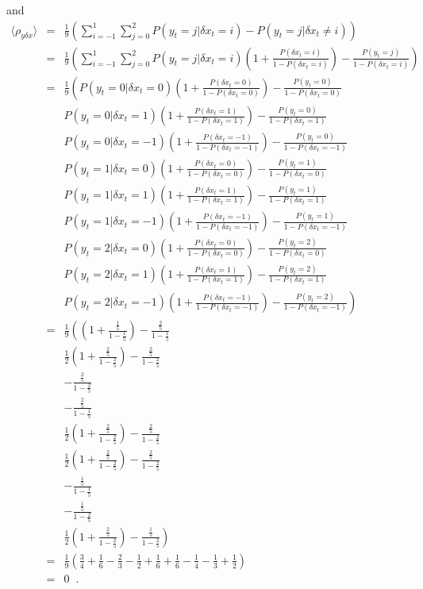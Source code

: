 \documentclass[a4paper,11pt]{article}
\begin{document}
and
\begin{eqnarray}
\langle \rho_{y\delta x}\rangle &=& \frac{1}{9}\left(\sum_{i=-1}^1 \sum_{j=0}^2 P(y_t = j | \delta x_t = i) - P(y_t = j | \delta x_t \neq i)\right)\\
&=& \frac{1}{9}\left(\sum_{i=-1}^1 \sum_{j=0}^2 P(y_t = j | \delta x_t = i)\left(1+\frac{P(\delta x_t = i)}{1-P(\delta x_t = i)}\right)-\frac{P(y_t = j)}{1-P(\delta x_t = i)}\right)\\
&=& \frac{1}{9}\left(P(y_t = 0 | \delta x_t = 0)\left(1+\frac{P(\delta x_t = 0)}{1-P(\delta x_t = 0)}\right)-\frac{P(y_t = 0)}{1-P(\delta x_t = 0)}\right.\\
& & P(y_t = 0 | \delta x_t = 1)\left(1+\frac{P(\delta x_t = 1)}{1-P(\delta x_t = 1)}\right)-\frac{P(y_t = 0)}{1-P(\delta x_t = 1)}\\
& & P(y_t = 0 | \delta x_t = -1)\left(1+\frac{P(\delta x_t = -1)}{1-P(\delta x_t = -1)}\right)-\frac{P(y_t = 0)}{1-P(\delta x_t = -1)}\\
& & P(y_t = 1 | \delta x_t = 0)\left(1+\frac{P(\delta x_t = 0)}{1-P(\delta x_t = 0)}\right)-\frac{P(y_t = 1)}{1-P(\delta x_t = 0)}\\
& & P(y_t = 1 | \delta x_t = 1)\left(1+\frac{P(\delta x_t = 1)}{1-P(\delta x_t = 1)}\right)-\frac{P(y_t = 1)}{1-P(\delta x_t = 1)}\\
& & P(y_t = 1 | \delta x_t = -1)\left(1+\frac{P(\delta x_t = -1)}{1-P(\delta x_t = -1)}\right)-\frac{P(y_t = 1)}{1-P(\delta x_t = -1)}\\
& & P(y_t = 2 | \delta x_t = 0)\left(1+\frac{P(\delta x_t = 0)}{1-P(\delta x_t = 0)}\right)-\frac{P(y_t = 2)}{1-P(\delta x_t = 0)}\\
& & P(y_t = 2 | \delta x_t = 1)\left(1+\frac{P(\delta x_t = 1)}{1-P(\delta x_t = 1)}\right)-\frac{P(y_t = 2)}{1-P(\delta x_t = 1)}\\
& & \left.P(y_t = 2 | \delta x_t = -1)\left(1+\frac{P(\delta x_t = -1)}{1-P(\delta x_t = -1)}\right)-\frac{P(y_t = 2)}{1-P(\delta x_t = -1)}\right)\\
&=& \frac{1}{9}\left(\left(1+\frac{\frac{1}{5}}{1-\frac{1}{5}}\right)-\frac{\frac{2}{5}}{1-\frac{1}{5}}\right.\\
& & \frac{1}{2}\left(1+\frac{\frac{2}{5}}{1-\frac{2}{5}}\right)-\frac{\frac{2}{5}}{1-\frac{2}{5}}\\
& & -\frac{\frac{2}{5}}{1-\frac{2}{5}}\\
& & -\frac{\frac{2}{5}}{1-\frac{1}{5}}\\
& & \frac{1}{2}\left(1+\frac{\frac{2}{5}}{1-\frac{2}{5}}\right)-\frac{\frac{2}{5}}{1-\frac{2}{5}}\\
& & \frac{1}{2}\left(1+\frac{\frac{2}{5}}{1-\frac{2}{5}}\right)-\frac{\frac{2}{5}}{1-\frac{2}{5}}\\
& & -\frac{\frac{1}{5}}{1-\frac{1}{5}}\\
& & -\frac{\frac{1}{5}}{1-\frac{2}{5}}\\
& & \left.\frac{1}{2}\left(1+\frac{\frac{2}{5}}{1-\frac{2}{5}}\right)-\frac{\frac{1}{5}}{1-\frac{2}{5}}\right)\\
&=& \frac{1}{9}\left(\frac{3}{4}+\frac{1}{6}-\frac{2}{3}-\frac{1}{2}+\frac{1}{6}+\frac{1}{6}-\frac{1}{4}-\frac{1}{3}+\frac{1}{2}\right)\\
&=& 0\;\;.
\end{eqnarray}
\end{document}
